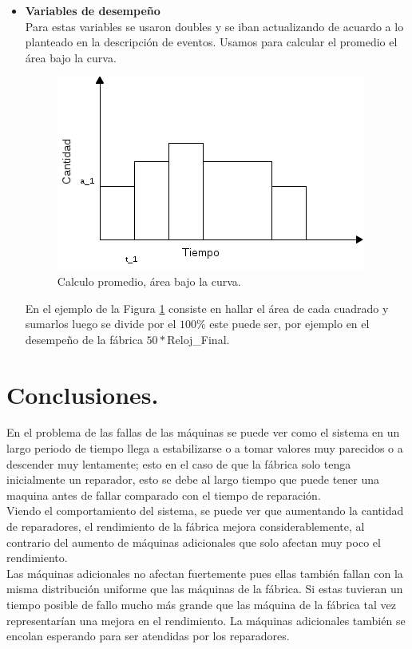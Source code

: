 \documentclass[12pt]{article}
\begin{document}
\begin{itemize}
 	 \item \textbf{Variables de desempeño}\\
 	 Para estas variables se usaron doubles y se iban actualizando de acuardo a lo planteado en la descripción de eventos. Usamos para calcular el promedio el área bajo la curva.
 	 
 	 \begin{figure}
 	  	\centering
 	   		\includegraphics[scale=0.5]{promedio.png} 
     	\caption{Calculo promedio, \'area bajo la curva.}
  		\label{fig:promedios}
 	 \end{figure}
 	 
 	 En el ejemplo de la Figura \ref{fig:promedios} consiste en hallar el área de cada cuadrado y sumarlos luego se divide por el $100\%$ este puede ser, por ejemplo en el desempeño de la f\'abrica  $50*$Reloj\_Final.
 	 
\end{itemize}


\section{Conclusiones.}

En el problema de las fallas de las máquinas se puede ver como el sistema en un largo periodo de tiempo llega a estabilizarse o a tomar valores muy parecidos o a descender muy lentamente; esto en el caso de que la fábrica solo tenga inicialmente un reparador, esto se debe al largo tiempo que puede tener una maquina antes de fallar comparado con el tiempo de reparación.\\

Viendo el comportamiento del sistema, se puede ver que aumentando la cantidad de reparadores, el rendimiento de la fábrica mejora considerablemente, al contrario del aumento de máquinas adicionales que solo afectan muy poco el rendimiento.\\

Las m\'aquinas adicionales no afectan fuertemente pues ellas también fallan con la misma distribución uniforme que las m\'aquinas de la f\'abrica. Si estas tuvieran un tiempo posible de fallo mucho más grande que las m\'aquina de la fábrica tal vez representarían una mejora en el rendimiento. La m\'aquinas adicionales tambi\'en se encolan esperando para ser atendidas por los reparadores.
\end{document}
